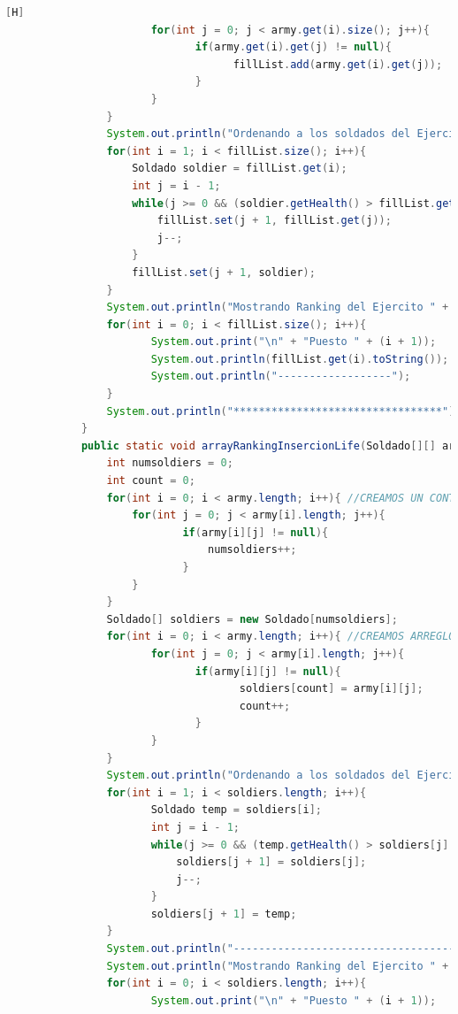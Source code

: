 \documentclass{article}
\begin{document}
\begin{lstlisting}[language=java,caption={Las lineas de codigos del metodo creado:}][H]
					   for(int j = 0; j < army.get(i).size(); j++){
							  if(army.get(i).get(j) != null){
									fillList.add(army.get(i).get(j));
							  }
					   }
				}
				System.out.println("Ordenando a los soldados del Ejercito " + num + " por el insercion: "); //APLICAMOS EL METODO INSERCION CON LOS PUNTOS DE VIDA
				for(int i = 1; i < fillList.size(); i++){
					Soldado soldier = fillList.get(i);
					int j = i - 1;
					while(j >= 0 && (soldier.getHealth() > fillList.get(j).getHealth())){ //APLICAMOS EL METODO INSERCION
						fillList.set(j + 1, fillList.get(j));
						j--;
					}
					fillList.set(j + 1, soldier);
				}
				System.out.println("Mostrando Ranking del Ejercito " + num + "....."); //MOSTRADOR DE RANKING DE LOS SOLDADOS
				for(int i = 0; i < fillList.size(); i++){
					   System.out.print("\n" + "Puesto " + (i + 1));
					   System.out.println(fillList.get(i).toString()); //DAMOS A CONOCER SUS DATOS Y EL PUESTO EN EL RANKING
					   System.out.println("------------------");
				}
				System.out.println("*********************************");
			}
			public static void arrayRankingInsercionLife(Soldado[][] army, int num){
				int numsoldiers = 0;
				int count = 0;
				for(int i = 0; i < army.length; i++){ //CREAMOS UN CONTADOR PARA SABER EL NUMERO DE SOLDADOS DE ESTE EJERCITO Y DESPUES CREAR UN ARREGLO EL CUAL PODEAMOS DARLE ESTE TAMAÑO Y LO PODAMOS USAR PARA EL METODO BURBUJA
					for(int j = 0; j < army[i].length; j++){
							if(army[i][j] != null){
								numsoldiers++;
							}
					}
				}
				Soldado[] soldiers = new Soldado[numsoldiers];
				for(int i = 0; i < army.length; i++){ //CREAMOS ARREGLO PARA QUE LOS SOLDADOS SE TRASLADEN DE UN ARREGLO BIDIMENSIONAL A UNO DIMENSIONAL PARA APLICAR EL METODO INSERCION
					   for(int j = 0; j < army[i].length; j++){
							  if(army[i][j] != null){
									 soldiers[count] = army[i][j];
									 count++;
							  }
					   }
				}
				System.out.println("Ordenando a los soldados del Ejercito " + num + " por el insercion: ");  //APLICAMOS EL METODO INSERCION CON LOS PUNTOS DE VIDA
				for(int i = 1; i < soldiers.length; i++){
					   Soldado temp = soldiers[i];
					   int j = i - 1;
					   while(j >= 0 && (temp.getHealth() > soldiers[j].getHealth())){
						   soldiers[j + 1] = soldiers[j];
						   j--;
					   }
					   soldiers[j + 1] = temp;
				}
				System.out.println("------------------------------------------");
				System.out.println("Mostrando Ranking del Ejercito " + num + ".....");
				for(int i = 0; i < soldiers.length; i++){
					   System.out.print("\n" + "Puesto " + (i + 1));

\end{lstlisting}
\end{document}
